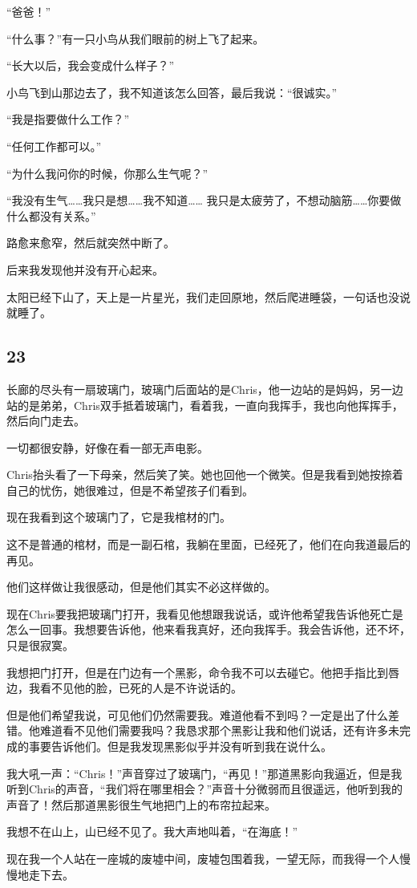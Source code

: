\documentclass[UTF8]{article}
\begin{document}
\par “爸爸！”
\par “什么事？”有一只小鸟从我们眼前的树上飞了起来。
\par “长大以后，我会变成什么样子？”
\par 小鸟飞到山那边去了，我不知道该怎么回答，最后我说：“很诚实。”
\par “我是指要做什么工作？”
\par “任何工作都可以。”
\par “为什么我问你的时候，你那么生气呢？”
\par “我没有生气……我只是想……我不知道…… 我只是太疲劳了，不想动脑筋……你要做什么都没有关系。”
\par 路愈来愈窄，然后就突然中断了。
\par 后来我发现他并没有开心起来。
\par 太阳已经下山了，天上是一片星光，我们走回原地，然后爬进睡袋，一句话也没说就睡了。
\subsection*{23}
\par 长廊的尽头有一扇玻璃门，玻璃门后面站的是Chris，他一边站的是妈妈，另一边站的是弟弟，Chris双手抵着玻璃门，看着我，一直向我挥手，我也向他挥挥手，然后向门走去。
\par 一切都很安静，好像在看一部无声电影。
\par Chris抬头看了一下母亲，然后笑了笑。她也回他一个微笑。但是我看到她按捺着自己的忧伤，她很难过，但是不希望孩子们看到。
\par 现在我看到这个玻璃门了，它是我棺材的门。
\par 这不是普通的棺材，而是一副石棺，我躺在里面，已经死了，他们在向我道最后的再见。
\par 他们这样做让我很感动，但是他们其实不必这样做的。
\par 现在Chris要我把玻璃门打开，我看见他想跟我说话，或许他希望我告诉他死亡是怎么一回事。我想要告诉他，他来看我真好，还向我挥手。我会告诉他，还不坏，只是很寂寞。
\par 我想把门打开，但是在门边有一个黑影，命令我不可以去碰它。他把手指比到唇边，我看不见他的脸，已死的人是不许说话的。
\par 但是他们希望我说，可见他们仍然需要我。难道他看不到吗？一定是出了什么差错。他难道看不见他们需要我吗？我恳求那个黑影让我和他们说话，还有许多未完成的事要告诉他们。但是我发现黑影似乎并没有听到我在说什么。
\par 我大吼一声：“Chris！”声音穿过了玻璃门，“再见！”那道黑影向我逼近，但是我听到Chris的声音，“我们将在哪里相会？”声音十分微弱而且很遥远，他听到我的声音了！然后那道黑影很生气地把门上的布帘拉起来。
\par 我想不在山上，山已经不见了。我大声地叫着，“在海底！”
\par 现在我一个人站在一座城的废墟中间，废墟包围着我，一望无际，而我得一个人慢慢地走下去。
\end{document}
